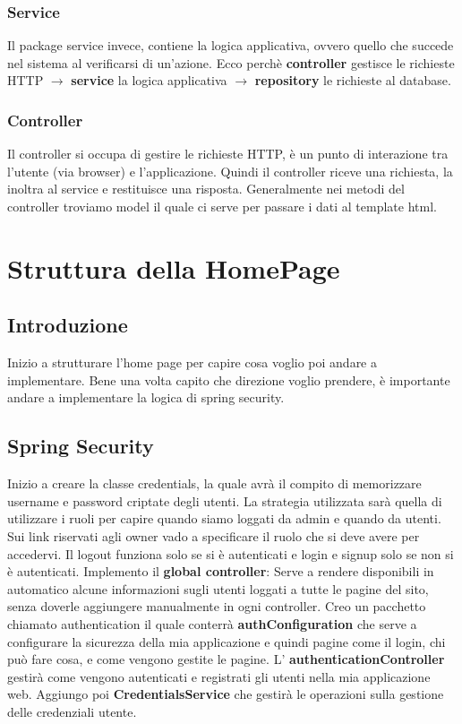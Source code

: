 \documentclass{article}
\numberwithin{equation}{subsection}
\begin{document}
\subsubsection{Service}
Il package service invece, contiene la logica applicativa, ovvero quello che succede nel sistema al verificarsi di un'azione. Ecco perchè \textbf{controller} gestisce le richieste HTTP $\xrightarrow{}$ \textbf{service} la logica applicativa $\xrightarrow{}$ \textbf{repository} le richieste al database.
\subsubsection{Controller}
Il controller si occupa di gestire le richieste HTTP, è un punto di interazione tra l'utente (via browser) e l'applicazione. Quindi il controller riceve una richiesta, la inoltra al service e restituisce una risposta. Generalmente nei metodi del controller troviamo model il quale ci serve per passare i dati al template html.
\section{Struttura della HomePage}
\subsection{Introduzione}
Inizio a strutturare l'home page per capire cosa voglio poi andare a implementare. Bene una volta capito che direzione voglio prendere, è importante andare a implementare la logica di spring security.
\subsection{Spring Security}
Inizio a creare la classe credentials, la quale avrà il compito di memorizzare username e password criptate degli utenti. La strategia utilizzata sarà quella di utilizzare i ruoli per capire quando siamo loggati da admin e quando da utenti. Sui link riservati agli owner vado a specificare il ruolo che si deve avere per accedervi. Il logout funziona solo se si è autenticati e login e signup solo se non si è autenticati. Implemento il \textbf{global controller}: Serve a rendere disponibili in automatico alcune informazioni sugli utenti loggati a tutte le pagine del sito, senza doverle aggiungere manualmente in ogni controller. Creo un pacchetto chiamato authentication il quale conterrà \textbf{authConfiguration} che serve a configurare la sicurezza della mia applicazione e quindi pagine come il login, chi può fare cosa, e come vengono gestite le pagine. L' \textbf{authenticationController} gestirà come vengono autenticati e registrati gli utenti nella mia applicazione web. Aggiungo poi \textbf{CredentialsService} che gestirà le operazioni sulla gestione delle credenziali utente.
\end{document}
